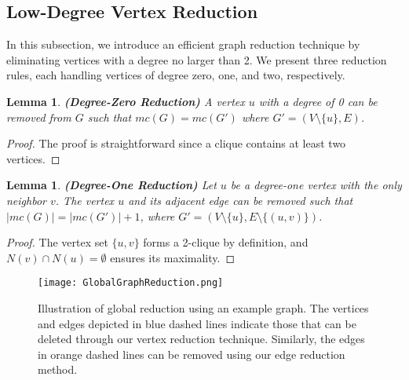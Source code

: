 \documentclass[sigconf, nonacm]{acmart}
\newtheorem{lem}[thm]{\bf Lemma}
\begin{document}
\subsection{Low-Degree Vertex Reduction}\label{subsec:low-degree reduction}

In this subsection, we introduce an efficient graph reduction technique by eliminating vertices with a degree no larger than 2. %
We present three reduction rules, each handling vertices of degree zero, one, and two, respectively. %

\begin{lem}{\textbf{(Degree-Zero Reduction)}}
\textit{
A vertex $u$ with a degree of 0 can be removed from $G$ such that $mc(G)=mc(G')$ where $G' = (V\setminus \{u\}, E)$.
}
\end{lem}
\begin{proof}
    The proof is straightforward since a clique contains at least two vertices.
\end{proof}

\begin{lem}{\textbf{(Degree-One Reduction)}}
\textit{
Let $u$ be a degree-one vertex with the only neighbor $v$. The vertex $u$ and its adjacent edge can be removed such that $\lvert mc(G)\rvert=\lvert mc(G')\rvert + 1$, where $G' = (V\setminus \{u\}, E\setminus \{(u,v)\})$.
}
\label{lemma2}
\end{lem}
\begin{proof} 
The vertex set $\{u,v\}$ forms a 2-clique by definition, and $N(v)\cap N(u)=\emptyset$ ensures its maximality.
\end{proof}

\begin{figure}[tbp]
\centerline{\texttt{[image: GlobalGraphReduction.png]}}
\vspace{-0.1in}
\caption{
Illustration of global reduction using an example graph. The vertices and edges depicted in blue dashed lines indicate those that can be deleted through our vertex reduction technique. Similarly, the edges in orange dashed lines can be removed using our edge reduction method.
}
\label{fig}
\vspace{-0.1in}
\end{figure}
\end{document}
